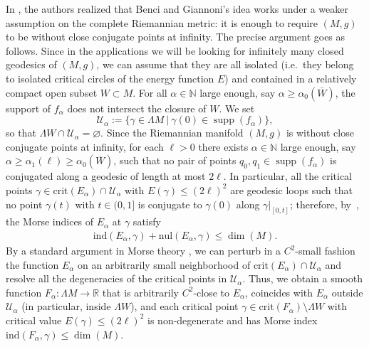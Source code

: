 \documentclass[reqno]{amsart}
\numberwithin{equation}{section}
\theoremstyle{personal}%
\theoremstyle{definition}
\newcommand{\N}{\mathds{N}}
\newcommand{\R}{\mathds{R}}
\newcommand{\crit}{\mathrm{crit}}
\newcommand{\ind}{\mathrm{ind}}
\newcommand{\nul}{\mathrm{nul}}
\DeclareMathOperator{\supp}{\mathrm{supp}}
\begin{document}
In \cite{Asselle:2017pd}, the authors realized that Benci and Giannoni's idea works under a weaker assumption on the complete Riemannian metric: it is enough to require $(M,g)$ to be without close conjugate points at infinity. The precise argument goes as follows. Since in the applications we will be looking for infinitely many closed geodesics of $(M,g)$, we can assume that they are all isolated (i.e.\ they belong to isolated critical circles of the energy function $E$) and contained in a relatively compact open subset $W\subset M$. For all $\alpha\in\N$ large enough, say $\alpha\geq\alpha_0(\overline{W})$, the support of $f_\alpha$ does not intersect the closure of $W$. We set 
\[\mathcal{U}_\alpha:=\big\{\gamma\in\Lambda M\ \big|\ \gamma(0)\in\supp(f_\alpha)\big\},\]
so that $\Lambda W\cap\mathcal{U}_\alpha=\varnothing$. Since the Riemannian manifold $(M,g)$ is without close conjugate points at infinity, for each $\ell>0$ there exists $\alpha\in\N$ large enough, say $\alpha\geq\alpha_1(\ell)\geq\alpha_0(\overline{W})$, such that no pair of points $q_0,q_1\in \supp(f_\alpha)$ is conjugated along a geodesic of length at most $2\ell$. In particular, all the critical points $\gamma\in\crit(E_\alpha)\cap\mathcal{U}_\alpha$ with $E(\gamma)\leq (2\ell)^2$ are geodesic loops such that no point $\gamma(t)$ with $t\in(0,1]$ is conjugate to $\gamma(0)$ along $\gamma|_{[0,t]}$; therefore, by~\cite[Lemma~2.1]{Asselle:2017pd}, the Morse indices of $E_\alpha$ at $\gamma$ satisfy
\begin{align*}
\ind(E_\alpha,\gamma)+\nul(E_\alpha,\gamma)\leq\dim(M).
\end{align*}
By a standard argument in Morse theory \cite{Marino:1975ii}, we can perturb in a $C^2$-small fashion the function $E_\alpha$ on an arbitrarily small neighborhood of $\crit(E_\alpha)\cap\mathcal{U}_\alpha$ and resolve all the degeneracies of the critical points in $\mathcal{U}_\alpha$. Thus, we obtain a smooth function $F_\alpha:\Lambda M\to\R$ that is arbitrarily $C^2$-close to $E_\alpha$, coincides with $E_\alpha$ outside $\mathcal{U}_\alpha$ (in particular, inside $\Lambda W$), and each critical point $\gamma\in\crit(F_\alpha)\setminus\Lambda W$ with critical value $E(\gamma)
\leq(2\ell)^2$ is non-degenerate and has Morse index $\ind(F_\alpha,\gamma)\leq\dim(M)$.
\end{document}
